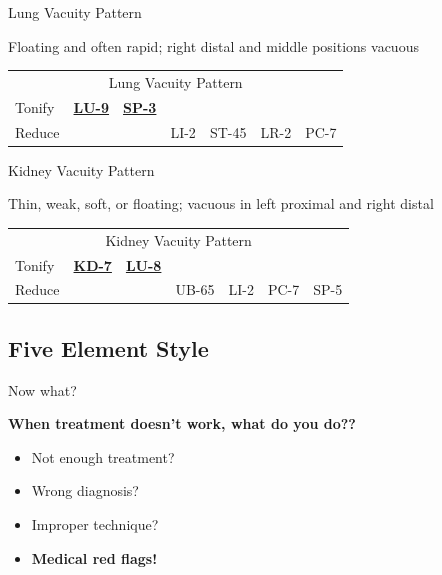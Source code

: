 \begin{frame}{Lung Vacuity Pattern}

\begin{pulse}
Floating and often rapid; right distal and middle positions vacuous
\end{pulse}

\begin{table}[]
\begin{tabular}{lllllll}
\multicolumn{7}{c}{Lung Vacuity Pattern}                                        \\
Tonify & {\ul \textbf{LU-9}} & {\ul \textbf{SP-3}} &      &       &      &      \\
Reduce &                     &                     & LI-2 & ST-45 & LR-2 & PC-7
\end{tabular}
\end{table}



\end{frame}

\begin{frame}{Kidney Vacuity Pattern}

\begin{pulse}
Thin, weak, soft, or floating; vacuous in left proximal and right distal
\end{pulse}

\begin{table}[]
\begin{tabular}{lllllll}
\multicolumn{7}{c}{Kidney Vacuity Pattern}                                      \\
Tonify & {\ul \textbf{KD-7}} & {\ul \textbf{LU-8}} &       &      &      &      \\
Reduce &                     &                     & UB-65 & LI-2 & PC-7 & SP-5
\end{tabular}
\end{table}


\end{frame}


\subsection{Five Element Style}

\begin{frame}{Now what?}

\textbf{\LARGE When treatment doesn't work, what do you do??}

\begin{itemize}
\pause
\item Not enough treatment?
\pause
\item Wrong diagnosis?
\pause
\item Improper technique?
\pause
\item \textbf{Medical red flags!}

\end{itemize}

\end{frame}

